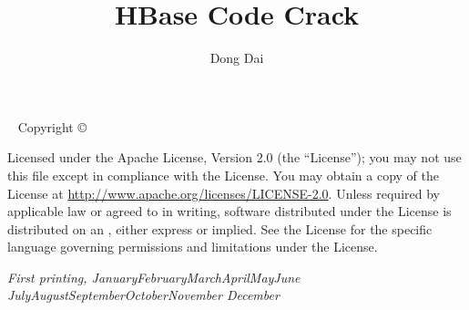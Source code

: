 \documentclass{tufte-book}
\title{HBase Code Crack}
\author[Dong Dai]{Dong Dai}
\newcommand{\monthyear}{%
  \ifcase\month\or January\or February\or March\or April\or May\or June\or
  July\or August\or September\or October\or November\or
  December\fi\space\number\year
}
\begin{document}
\frontmatter

\maketitle

\newpage
\begin{fullwidth}
  ~\vfill
  \thispagestyle{empty}
  \setlength{\parindent}{0pt}
  \setlength{\parskip}{\baselineskip}
  Copyright \copyright \ \the\year\ \thanklessauthor
  \par{}
  \par{}
  \par Licensed under the Apache License, Version 2.0 (the ``License''); you may not
use this file except in compliance with the License. You may obtain a copy
of the License at \url{http://www.apache.org/licenses/LICENSE-2.0}. Unless
required by applicable law or agreed to in writing, software distributed
under the License is distributed on an , either express or implied. See the
License for the specific language governing permissions and limitations
under the License.

\par\textit{First printing, \monthyear}
\end{fullwidth}
\end{document}
